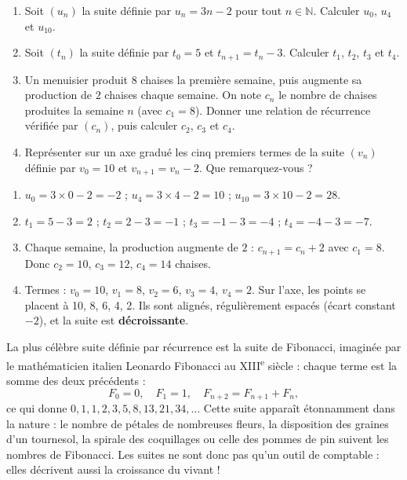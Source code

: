 \documentclass[11pt]{article}
\newcommand{\cle}[1]{{\popxbold\color{popdark}#1}}
\begin{document}
\begin{exercice}
\begin{enumerate}
\item Soit $(u_n)$ la suite définie par $u_n = 3n - 2$ pour tout $n \in \mathbb{N}$. Calculer $u_0$, $u_4$ et $u_{10}$.
\item Soit $(t_n)$ la suite définie par $t_0 = 5$ et $t_{n+1} = t_n - 3$. Calculer $t_1$, $t_2$, $t_3$ et $t_4$.
\item Un menuisier produit $8$ chaises la première semaine, puis augmente sa production de $2$ chaises chaque semaine. On note $c_n$ le nombre de chaises produites la semaine $n$ (avec $c_1 = 8$). Donner une relation de récurrence vérifiée par $(c_n)$, puis calculer $c_2$, $c_3$ et $c_4$.
\item Représenter sur un axe gradué les cinq premiers termes de la suite $(v_n)$ définie par $v_0 = 10$ et $v_{n+1} = v_n - 2$. Que remarquez-vous ?
\end{enumerate}
\end{exercice}

\begin{corrige}[Exercice n1]
\begin{enumerate}
\item $u_0 = 3 \times 0 - 2 = -2$ ; $u_4 = 3 \times 4 - 2 = 10$ ; $u_{10} = 3 \times 10 - 2 = 28$.
\item $t_1 = 5 - 3 = 2$ ; $t_2 = 2 - 3 = -1$ ; $t_3 = -1 - 3 = -4$ ; $t_4 = -4 - 3 = -7$.
\item Chaque semaine, la production augmente de $2$ : $c_{n+1} = c_n + 2$ avec $c_1 = 8$. Donc $c_2 = 10$, $c_3 = 12$, $c_4 = 14$ chaises.
\item Termes : $v_0=10$, $v_1=8$, $v_2=6$, $v_3=4$, $v_4=2$. Sur l'axe, les points se placent à 10, 8, 6, 4, 2. Ils sont alignés, régulièrement espacés (écart constant $-2$), et la suite est \textbf{décroissante}.
\end{enumerate}
\end{corrige}

\begin{savaistu}
La plus célèbre suite définie par récurrence est la \cle{suite de Fibonacci}, imaginée par le mathématicien italien Leonardo Fibonacci au XIII\textsuperscript{e} siècle : chaque terme est la somme des deux précédents :
\[
F_0 = 0,\quad F_1 = 1,\quad F_{n+2} = F_{n+1} + F_n,
\]
ce qui donne $0, 1, 1, 2, 3, 5, 8, 13, 21, 34, \ldots$ Cette suite apparaît étonnamment dans la nature : le nombre de pétales de nombreuses fleurs, la disposition des graines d'un tournesol, la spirale des coquillages ou celle des pommes de pin suivent les nombres de Fibonacci. Les suites ne sont donc pas qu'un outil de comptable : elles décrivent aussi la croissance du vivant !
\end{savaistu}
\end{document}
